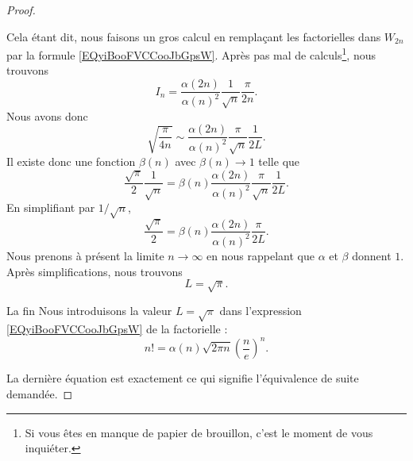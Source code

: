 \begin{proof}
\begin{subproof}
            Cela étant dit, nous faisons un gros calcul en remplaçant les factorielles dans \( W_{2n}\) par la formule \eqref{EQyiBooFVCCooJbGpsW}. Après pas mal de calculs\footnote{Si vous êtes en manque de papier de brouillon, c'est le moment de vous inquiéter.}, nous trouvons
            \begin{equation}
                I_n=\frac{ \alpha(2n) }{ \alpha(n)^2 }\frac{1}{ \sqrt{ n } }\frac{ \pi }{ 2n }.
            \end{equation}
            Nous avons donc
            \begin{equation}
                \sqrt{ \frac{ \pi }{ 4n } }\sim \frac{ \alpha(2n) }{ \alpha(n)^2 }\frac{ \pi }{ \sqrt{ n } }\frac{1}{ 2L }.
            \end{equation}
            Il existe donc une fonction \( \beta(n)\) avec \( \beta(n)\to 1\) telle que
            \begin{equation}
                \frac{ \sqrt{ \pi } }{2}\frac{1}{ \sqrt{ n } }=\beta(n)\frac{ \alpha(2n) }{ \alpha(n)^2 }\frac{ \pi }{ \sqrt{ n } }\frac{1}{ 2L }.
            \end{equation}
            En simplifiant par \( 1/\sqrt{ n }\),
            \begin{equation}
                \frac{ \sqrt{ \pi } }{2}=\beta(n)\frac{ \alpha(2n) }{ \alpha(n)^2 }\frac{\pi}{ 2L }.
            \end{equation}
            Nous prenons à présent la limite \( n\to \infty\) en nous rappelant que \( \alpha\) et \( \beta \) donnent \( 1\). Après simplifications, nous trouvons
            \begin{equation}
                L=\sqrt{ \pi }.
            \end{equation}
            
        \item[La fin]
            Nous introduisons la valeur \( L=\sqrt{ \pi }\) dans l'expression \eqref{EQyiBooFVCCooJbGpsW} de la factorielle :
            \begin{equation}
                n!=\alpha(n)\sqrt{ 2\pi n }\left( \frac{ n }{ e } \right)^n.
            \end{equation}
    \end{subproof}
    La dernière équation est exactement ce qui signifie l'équivalence de suite demandée.
\end{proof}

